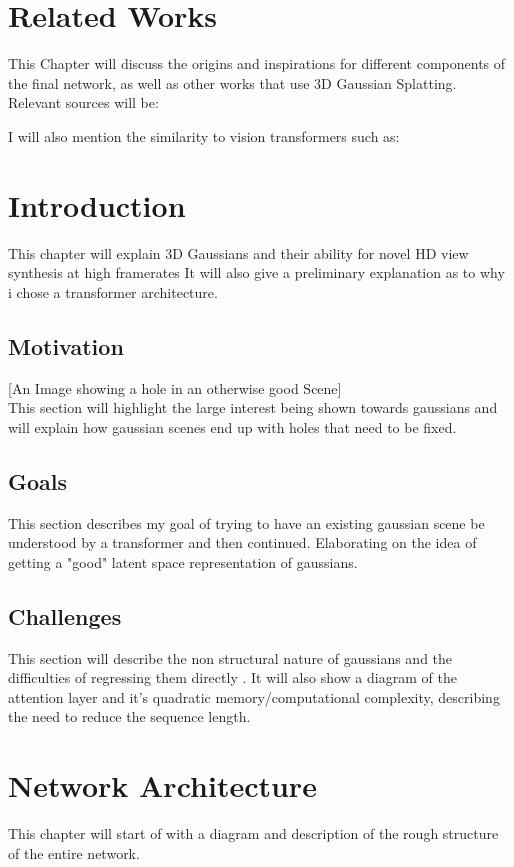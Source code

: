 
\chapter{Related Works}

This Chapter will discuss the origins and inspirations for different components of the final network, as well as other works that use 3D Gaussian Splatting. Relevant sources will be:
\cite{kerbl3Dgaussians}
\cite{zou2023triplane}
\cite{yu2021pointbert}
\cite{yu2021pointr}


I will also mention the similarity to vision transformers such as:
\cite{devlin2019bert}
\cite{yu2021diverse}
\cite{Miao2024}


\chapter{Introduction}
This chapter will explain 3D Gaussians and their ability for novel HD view synthesis at high framerates \cite{kerbl3Dgaussians}
It will also give a preliminary explanation as to why i chose a transformer architecture. \cite{vaswani2023attention}

\section{Motivation}
[An Image showing a hole in an otherwise good Scene]\\
This section will highlight the large interest being shown towards gaussians and will explain how gaussian scenes end up with holes that need to be fixed.

\section{Goals}
This section describes my goal of trying to have an existing gaussian scene be understood by a transformer and then continued. Elaborating on the idea of getting a "good" latent space representation of gaussians.

\section{Challenges}
This section will describe the non structural nature of gaussians and the difficulties of regressing them directly \cite{zou2023triplane}.
It will also show a diagram of the attention layer and it's quadratic memory/computational complexity, describing the need to reduce the sequence length.

\chapter{Network Architecture}
This chapter will start of with a diagram and description of the rough structure of the entire network.

